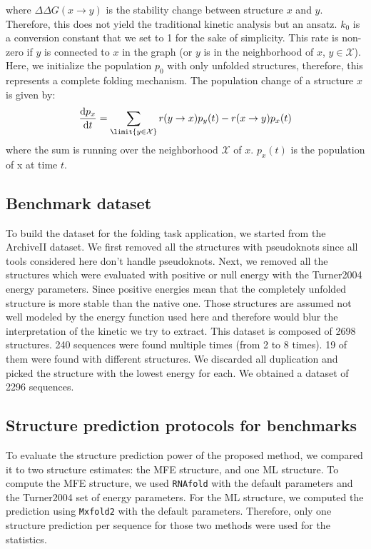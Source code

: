 \documentclass[a4paper,12pt]{article}
\begin{document}
where \(\Delta \Delta G(x\rightarrow y)\) is the stability change between
structure \(x\) and \(y\). Therefore, this does not yield the traditional kinetic
analysis but an ansatz. \(k_0\) is a conversion constant that we set to 1 for the
sake of simplicity. This rate is non-zero if \(y\) is connected to \(x\) in the
graph (or \(y\) is in the neighborhood of \(x\), \(y \in \mathcal{X}\)). Here, we
initialize the population \(p_{0}\) with only unfolded structures, therefore, this
represents a complete folding mechanism. The population change of a structure
\(x\) is given by:
\begin{equation}
\frac{\text{d}p_x}{\text{d}t} = \sum_\limit{y \in \mathcal{X}}
r(y \rightarrow x) p_{y}(t) - r(x \rightarrow y) p_{x}(t)
\end{equation}
where the sum is running over the neighborhood \(\mathcal{X}\) of \(x\). \(p_{x}(t)\)
is the population of x at time \(t\).

\subsection*{Benchmark dataset}
\label{sec:orgf36bfba}
To build the dataset for the folding task application, we started from the
ArchiveII dataset. We first removed all the structures with pseudoknots since
all tools considered here don't handle pseudoknots. Next, we removed all the
structures which were evaluated with positive or null energy with the Turner2004
energy parameters. Since positive energies mean that the completely unfolded
structure is more stable than the native one. Those structures are assumed not
well modeled by the energy function used here and therefore would blur the
interpretation of the kinetic we try to extract. This dataset is composed of
2698 structures. 240 sequences were found multiple times (from 2 to 8 times). 19
of them were found with different structures. We discarded all duplication and
picked the structure with the lowest energy for each. We obtained a dataset of
2296 sequences.
\subsection*{Structure prediction protocols for benchmarks}
\label{sec:orgbe301a4}
To evaluate the structure prediction power of the proposed method, we compared
it to two structure estimates: the MFE structure, and one ML structure. To
compute the MFE structure, we used \texttt{RNAfold} with the default parameters and the
Turner2004 set of energy parameters. For the ML structure, we computed the
prediction using \texttt{Mxfold2} with the default parameters. Therefore, only one
structure prediction per sequence for those two methods were used for the
statistics.
\end{document}
